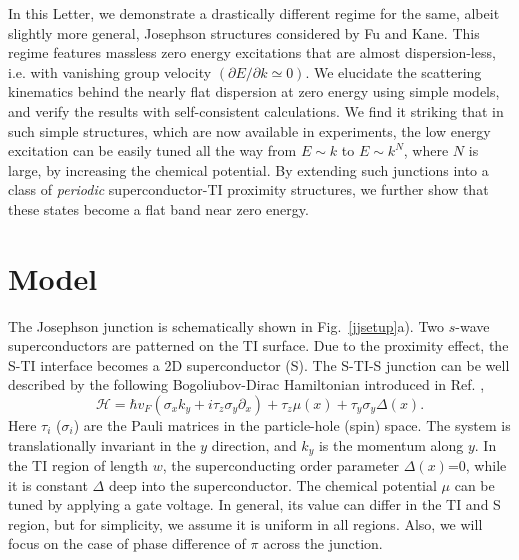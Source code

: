 In this Letter, we demonstrate a drastically different regime for the same, albeit slightly more general, Josephson structures considered by Fu and Kane.
This regime features massless zero energy excitations that are almost dispersion-less, i.e. with vanishing group velocity $(\partial E/\partial k\simeq0)$.
We elucidate the scattering kinematics behind the nearly flat dispersion at zero energy using simple models, and verify the results with self-consistent calculations.
We find it striking that in such simple structures, which are now available in experiments, the low energy excitation can be easily tuned all the way from $E\sim k$ to $E\sim k^N$, where $N$ is large, by increasing the chemical potential. 
By extending such junctions into a class of {\it periodic} superconductor-TI proximity structures, we further show that these states become a flat band near zero energy.

\section{Model}
The Josephson junction is schematically shown in Fig.~\ref{jjsetup}a). Two $s$-wave superconductors are patterned
on the TI surface. Due to the proximity effect, the S-TI interface becomes a 2D superconductor (S).
The S-TI-S junction can be well described by the following Bogoliubov-Dirac Hamiltonian introduced in Ref. \cite{fu_superconducting_2008},
\begin{equation}
\mathcal{H}=\hbar v_F(\sigma_x k_y +i \tau_z\sigma_y \partial_x) + \tau_z \mu(x) + \tau_y \sigma_y \Delta(x).
\label{ham}
\end{equation}
Here $\tau_i$ ($\sigma_i$) are the Pauli matrices in the particle-hole (spin) space. 
The system is translationally invariant in the $y$ direction, and $k_y$ is the momentum along $y$. 
In the TI region of 
length $w$, the superconducting order parameter $\Delta(x)$=0, while it is constant $\Delta$ deep into the superconductor. 
The chemical potential $\mu$ can be tuned by applying a gate voltage.
In general, its value can differ in the TI and S region, but for simplicity,
we assume it is uniform in all regions. 
Also, we will focus on the case of phase difference of $\pi$ across the junction.

